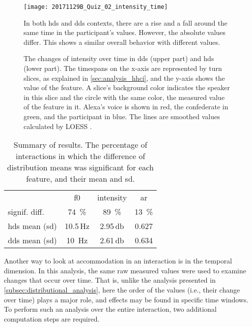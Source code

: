 \begin{figure}[t]
	\centering
	{\texttt{[image: 20171129B\_Quiz\_02\_intensity\_time]}
	\label{fig:hds_dds_time_intensity}}
	\caption[Comparison of temporal intensity trends of \acs{hds} and \acs{dds}]
		{The changes of intensity over time in \ac{dds} (upper part) and \ac{hds} (lower part).
		The timespans on the x-axis are represented by turn slices, as explained in \cref{sec:analysis_hhci}, and the y-axis shows the value of the feature.
		A slice's background color indicates the speaker in this slice and the circle with the same color, the measured value of the feature in it.
		Alexa's voice is shown in red, the confederate in green, and the participant in blue.
		The lines are smoothed values calculated by LOESS \citep{Cleveland1988locally}.}
		In both \ac{hds} and \ac{dds} contexts, there are a rise and a fall around the same time in the participant's values.
		However, the absolute values differ.
		This shows a similar overall behavior with different values.
	\label{fig:hds_dds_time_comparisons}
\end{figure}
%
\begin{table}[t]
	\centering
	\caption[Percentage of significantly different interaction pairs in crowd component]
		{Summary of results. The percentage of interactions in which the difference of distribution means was significant for each feature, and their mean and \acf{sd}.}
	\label{tab:results_hhci_addressee}
	\begin{tabularx}{\linewidth}{XSSS}
		\toprule
		& \acs{f0} 						& {intensity}				& \acs{ar}									\\
		signif. diff.					& \SI{74}{\percent}			& \SI{89}{\percent}		& \SI{13}{\percent} \\
		\acs{hds} mean (\acs{sd}) 		& 10.5\,\si{\hertz}			& 2.95\,\si{\decibel}	& 0.627				\\
		\acs{dds} mean (\acs{sd}) 		& 10 \,\si{\hertz}		& 2.61\,\si{\decibel}	& 0.634				\\
		\bottomrule	
	\end{tabularx}
\end{table}
%	
Another way to look at accommodation in an interaction is in the temporal dimension.
In this analysis, the same raw measured values were used to examine changes that occur over time.
That is, unlike the analysis presented in \cref{subsec:distributional_analysis}, here the order of the values (i.e., their change over time) plays a major role, and effects may be found in specific time windows.
To perform such an analysis over the entire interaction, two additional computation steps are required.

